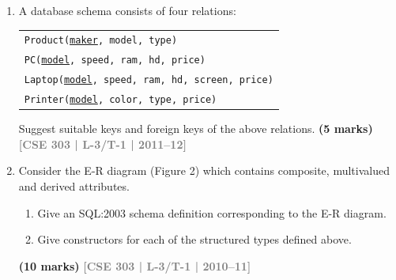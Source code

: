 \documentclass[12pt]{article}
\newcommand{\yr}[1]{\hfill\textcolor{gray}{\small\textbf{[#1]}}}
\newcommand{\mk}[1]{\textcolor{orange!70!black}{\small\textbf{(#1 marks)}}}
\begin{document}
\begin{enumerate}
\begin{center}
\end{center}

\mk{15} \yr{CSE 303 | L-3/T-1 | 2012--13}


\item A database schema consists of four relations:
\begin{center}
\begin{tabular}{l}
\texttt{Product(\underline{maker}, model, type)}\\
\texttt{PC(\underline{model}, speed, ram, hd, price)}\\
\texttt{Laptop(\underline{model}, speed, ram, hd, screen, price)}\\
\texttt{Printer(\underline{model}, color, type, price)}
\end{tabular}
\end{center}
Suggest suitable keys and foreign keys of the above relations.
\mk{5} \yr{CSE 303 | L-3/T-1 | 2011--12}


\item Consider the E-R diagram (Figure 2) which contains composite, multivalued and derived attributes.
\begin{enumerate}
  \item Give an SQL:2003 schema definition corresponding to the E-R diagram.
  \item Give constructors for each of the structured types defined above.
\end{enumerate}
\mk{10} \yr{CSE 303 | L-3/T-1 | 2010--11}


\end{enumerate}
\end{document}
